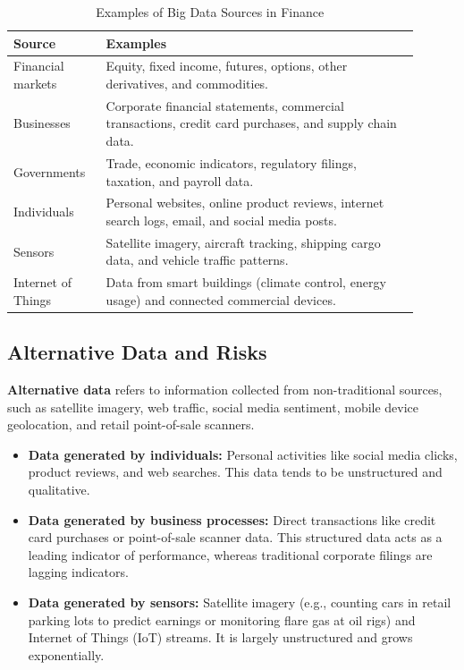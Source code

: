 \begin{table}[!htbp]
\centering
\caption{Examples of Big Data Sources in Finance}
\label{tab:big_data_sources}
\begin{tabular}{p{0.2\linewidth} | p{0.7\linewidth}}
	\toprule
	\textbf{Source} & \textbf{Examples} \\
	\midrule
	Financial markets & Equity, fixed income, futures, options, other derivatives, and commodities. \\
	Businesses & Corporate financial statements, commercial transactions, credit card purchases, and supply chain data. \\
	Governments & Trade, economic indicators, regulatory filings, taxation, and payroll data. \\
	Individuals & Personal websites, online product reviews, internet search logs, email, and social media posts. \\
	Sensors & Satellite imagery, aircraft tracking, shipping cargo data, and vehicle traffic patterns. \\
	Internet of Things & Data from smart buildings (climate control, energy usage) and connected commercial devices. \\
	\bottomrule
\end{tabular}
\end{table}

\subsection{Alternative Data and Risks}
\textbf{Alternative data} refers to information collected from non-traditional sources, such as satellite imagery, web traffic, social media sentiment, mobile device geolocation, and retail point-of-sale scanners.
\begin{itemize}[noitemsep, topsep=2pt, parsep=0pt]
	\item \textbf{Data generated by individuals:} Personal activities like social media clicks, product reviews, and web searches. This data tends to be unstructured and qualitative.
	\item \textbf{Data generated by business processes:} Direct transactions like credit card purchases or point-of-sale scanner data. This structured data acts as a leading indicator of performance, whereas traditional corporate filings are lagging indicators.
	\item \textbf{Data generated by sensors:} Satellite imagery (e.g., counting cars in retail parking lots to predict earnings or monitoring flare gas at oil rigs) and Internet of Things (IoT) streams. It is largely unstructured and grows exponentially.
\end{itemize}

